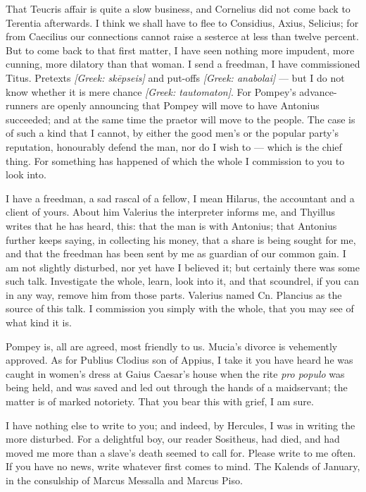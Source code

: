 

 That Teucris affair is quite a slow business, and Cornelius did not come back to Terentia afterwards. I think we shall have to flee to Considius, Axius, Selicius; for from Caecilius our connections cannot raise a sesterce at less than twelve percent. But to come back to that first matter, I have seen nothing more impudent, more cunning, more dilatory than that woman. I send a freedman, I have commissioned Titus. Pretexts \textit{[Greek: sk\=epseis]} and put-offs \textit{[Greek: anabolai]} --- but I do not know whether it is mere chance \textit{[Greek: tautomaton]}. For Pompey's advance-runners are openly announcing that Pompey will move to have Antonius succeeded; and at the same time the praetor will move to the people. The case is of such a kind that I cannot, by either the good men's or the popular party's reputation, honourably defend the man, nor do I wish to --- which is the chief thing. For something has happened of which the whole I commission to you to look into.

 I have a freedman, a sad rascal of a fellow, I mean Hilarus, the accountant and a client of yours. About him Valerius the interpreter informs me, and Thyillus writes that he has heard, this: that the man is with Antonius; that Antonius further keeps saying, in collecting his money, that a share is being sought for me, and that the freedman has been sent by me as guardian of our common gain. I am not slightly disturbed, nor yet have I believed it; but certainly there was some such talk. Investigate the whole, learn, look into it, and that scoundrel, if you can in any way, remove him from those parts. Valerius named Cn. Plancius as the source of this talk. I commission you simply with the whole, that you may see of what kind it is.

 Pompey is, all are agreed, most friendly to us. Mucia's divorce is vehemently approved. As for Publius Clodius son of Appius, I take it you have heard he was caught in women's dress at Gaius Caesar's house when the rite \textit{pro populo} was being held, and was saved and led out through the hands of a maidservant; the matter is of marked notoriety. That you bear this with grief, I am sure.

 I have nothing else to write to you; and indeed, by Hercules, I was in writing the more disturbed. For a delightful boy, our reader Sositheus, had died, and had moved me more than a slave's death seemed to call for. Please write to me often. If you have no news, write whatever first comes to mind. The Kalends of January, in the consulship of Marcus Messalla and Marcus Piso.
